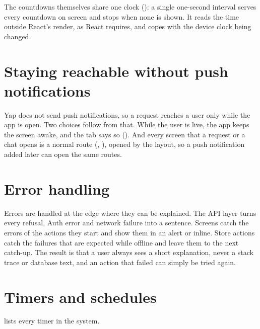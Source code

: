 The countdowns themselves share one clock (): a single one-second interval serves every
countdown on screen and stops when none is shown. It reads the time outside React's render, as React
requires, and copes with the device clock being changed.

\section{Staying reachable without push notifications}

Yap does not send push notifications, so a request reaches a user only while the app is open. Two choices
follow from that. While the user is live, the app keeps the screen awake, and the  tab says so
(). And every screen that a request or a chat opens is a normal route
(, ), opened by the  layout, so a push notification added later
can open the same routes.

\section{Error handling}

Errors are handled at the edge where they can be explained. The API layer turns every refusal, Auth error
and network failure into a sentence. Screens catch the errors of the actions they start and show them in
an alert or inline. Store actions catch the failures that are expected while offline and leave them to the
next catch-up. The result is that a user always sees a short explanation, never a stack trace or database
text, and an action that failed can simply be tried again.

\section{Timers and schedules}

 lists every timer in the system.

